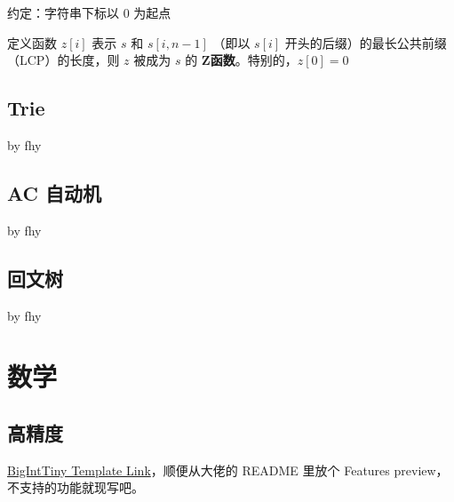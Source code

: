 \documentclass[12pt]{article}
\begin{document}
约定：字符串下标以 $0$ 为起点

定义函数 $z[i]$ 表示 $s$ 和 $s[i,n-1]$ （即以 $s[i]$ 开头的后缀）的最长公共前缀（LCP）的长度，则 $z$ 被成为 $s$ 的 \textbf{Z函数}。特别的，$z[0]=0$



\newpage

\subsection{Trie}

by fhy



\newpage

\subsection{AC 自动机}

by fhy



\newpage

\subsection{回文树}

by fhy



\newpage

{\centering\section{数学}}

\subsection{高精度}

\href{https://github.com/Baobaobear/MiniBigInteger/blob/main/bigint_tiny.h}{BigIntTiny Template Link}，顺便从大佬的 README 里放个 Features preview，不支持的功能就现写吧。
\end{document}
